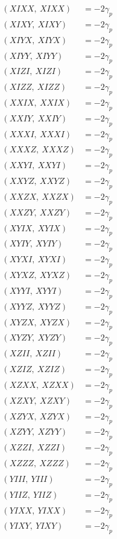 \documentclass{article}
\begin{document}
\begin{align*}
  (XIXX,\ XIXX) &= - 2 \gamma_{p} \\
  (XIXY,\ XIXY) &= - 2 \gamma_{p} \\
  (XIYX,\ XIYX) &= - 2 \gamma_{p} \\
  (XIYY,\ XIYY) &= - 2 \gamma_{p} \\
  (XIZI,\ XIZI) &= - 2 \gamma_{p} \\
  (XIZZ,\ XIZZ) &= - 2 \gamma_{p} \\
  (XXIX,\ XXIX) &= - 2 \gamma_{p} \\
  (XXIY,\ XXIY) &= - 2 \gamma_{p} \\
  (XXXI,\ XXXI) &= - 2 \gamma_{p} \\
  (XXXZ,\ XXXZ) &= - 2 \gamma_{p} \\
  (XXYI,\ XXYI) &= - 2 \gamma_{p} \\
  (XXYZ,\ XXYZ) &= - 2 \gamma_{p} \\
  (XXZX,\ XXZX) &= - 2 \gamma_{p} \\
  (XXZY,\ XXZY) &= - 2 \gamma_{p} \\
  (XYIX,\ XYIX) &= - 2 \gamma_{p} \\
  (XYIY,\ XYIY) &= - 2 \gamma_{p} \\
  (XYXI,\ XYXI) &= - 2 \gamma_{p} \\
  (XYXZ,\ XYXZ) &= - 2 \gamma_{p} \\
  (XYYI,\ XYYI) &= - 2 \gamma_{p} \\
  (XYYZ,\ XYYZ) &= - 2 \gamma_{p} \\
  (XYZX,\ XYZX) &= - 2 \gamma_{p} \\
  (XYZY,\ XYZY) &= - 2 \gamma_{p} \\
  (XZII,\ XZII) &= - 2 \gamma_{p} \\
  (XZIZ,\ XZIZ) &= - 2 \gamma_{p} \\
  (XZXX,\ XZXX) &= - 2 \gamma_{p} \\
  (XZXY,\ XZXY) &= - 2 \gamma_{p} \\
  (XZYX,\ XZYX) &= - 2 \gamma_{p} \\
  (XZYY,\ XZYY) &= - 2 \gamma_{p} \\
  (XZZI,\ XZZI) &= - 2 \gamma_{p} \\
  (XZZZ,\ XZZZ) &= - 2 \gamma_{p} \\
  (YIII,\ YIII) &= - 2 \gamma_{p} \\
  (YIIZ,\ YIIZ) &= - 2 \gamma_{p} \\
  (YIXX,\ YIXX) &= - 2 \gamma_{p} \\
  (YIXY,\ YIXY) &= - 2 \gamma_{p} \\

\end{align*}
\end{document}
